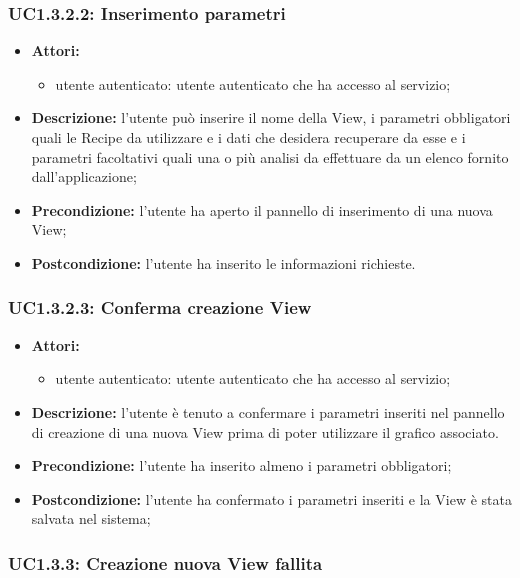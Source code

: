 \subsubsection{UC1.3.2.2: Inserimento parametri}

\begin{itemize}
	\item \textbf{Attori:}
	\begin{itemize}
		\item utente autenticato: utente autenticato che ha accesso al servizio;
	\end{itemize}
	\item \textbf{Descrizione:} l'utente può inserire il nome della View, i parametri obbligatori quali le Recipe da utilizzare e i dati che desidera recuperare da esse e i parametri facoltativi quali una o più analisi da effettuare da un elenco fornito dall'applicazione;
	\item \textbf{Precondizione:} l'utente ha aperto il pannello di inserimento di una nuova View;
	\item \textbf{Postcondizione:} l'utente ha inserito le informazioni richieste.
\end{itemize}

\subsubsection{UC1.3.2.3: Conferma creazione View}

\begin{itemize}
	\item \textbf{Attori:}
	\begin{itemize}
		\item utente autenticato: utente autenticato che ha accesso al servizio;
	\end{itemize}
	\item \textbf{Descrizione:} l'utente è tenuto a confermare i parametri inseriti nel pannello di creazione di una nuova View prima di poter utilizzare il grafico associato.
	\item \textbf{Precondizione:} l'utente ha inserito almeno i parametri obbligatori;
	\item \textbf{Postcondizione:} l'utente ha confermato i parametri inseriti e la View è stata salvata nel sistema;
\end{itemize}

\subsubsection{UC1.3.3: Creazione nuova View fallita}

